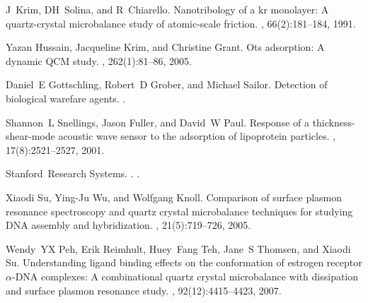 \documentclass[floatfix,superscriptaddress,a4paper,twocolumn]{revtex4-1}
\begin{document}
\begin{thebibliography}{10}
  J~Krim, DH~Solina, and R~Chiarello.
  \newblock Nanotribology of a kr monolayer: A quartz-crystal microbalance study
  of atomic-scale friction.
  , 66(2):181--184, 1991.

  Yazan Hussain, Jacqueline Krim, and Christine Grant.
  \newblock Ots adsorption: A dynamic {QCM} study.
  , 262(1):81--86, 2005.

  Daniel~E Gottschling, Robert~D Grober, and Michael Sailor.
  \newblock Detection of biological warefare agents.
  .

  Shannon~L Snellings, Jason Fuller, and David~W Paul.
  \newblock Response of a thickness-shear-mode acoustic wave sensor to the
  adsorption of lipoprotein particles.
  , 17(8):2521--2527, 2001.

  Stanford~Research Systems.
  .
  .

  Xiaodi Su, Ying-Ju Wu, and Wolfgang Knoll.
  \newblock Comparison of surface plasmon resonance spectroscopy and quartz
  crystal microbalance techniques for studying {DNA} assembly and
  hybridization.
  , 21(5):719--726, 2005.

  Wendy~YX Peh, Erik Reimhult, Huey~Fang Teh, Jane~S Thomsen, and Xiaodi Su.
  \newblock Understanding ligand binding effects on the conformation of estrogen
  receptor $\alpha$-{DNA} complexes: A combinational quartz crystal
  microbalance with dissipation and surface plasmon resonance study.
  , 92(12):4415--4423, 2007.

\end{thebibliography}

\end{document}
